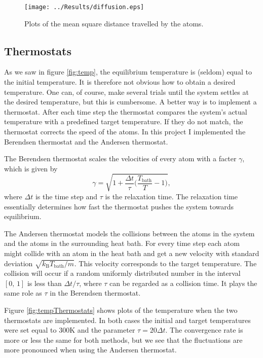 \documentclass[12pt]{article}
\newcommand{\bdi}{\begin{displaymath}}
\newcommand{\edi}{\end{displaymath}}
\begin{document}
\begin{figure}[!ht]
 \begin{center}
 \label{fig:diffusion}
  \texttt{[image: ../Results/diffusion.eps]}
  \caption{Plots of the mean square distance travelled by the atoms.}
 \end{center}
\end{figure}


\subsection{Thermostats}
\label{sec:thermostats}
As we saw in figure \ref{fig:temp}, the equilibrium temperature is (seldom) equal to the initial temperature. It is therefore not obvious how to obtain a desired temperature.
One can, of course, make several trials until the system settles at the desired temperature, but this is cumbersome. A better way is to implement a thermostat. After each time step the thermostat
compares the system's actual temperature with a predefined target temperature. If they do not match, the thermostat corrects the speed of the atoms. In this project I implemented the Berendsen thermostat and the Andersen thermostat.

The Berendsen thermostat scales the velocities of every atom with a facter $\gamma$, which is given by
\bdi
\gamma = \sqrt{1 + \frac{\Delta t}{\tau}\Big(\frac{T_{\mathrm{bath}}}{T} - 1\Big)},
\edi
where $\Delta t$ is the time step and $\tau$ is the relaxation time. The relaxation time essentially determines how fast the thermostat pushes the system towards equilibrium.

The Andersen thermostat models the collisions between the atoms in the system and the atoms in the surrounding heat bath. For every time step each atom might collide with
an atom in the heat bath and get a new velocity with standard deviation $\sqrt{k_\mathrm{B}T_\mathrm{bath}/m}$. This velocity corresponds to the target temperature.
The collision will occur if a random uniformly distributed number in the interval $[0,\,1]$ is less than $\Delta t/\tau$, where $\tau$ can be regarded as a collision time.
It plays the same role as $\tau$ in the Berendsen thermostat.

Figure \ref{fig:tempThermostats} shows plots of the temperature when the two thermostats are implemented. In both cases the initial and target temperatures were set equal to 300K and
the parameter $\tau = 20 \Delta t$. The convergence rate is more or less the same for both methods, but we see that the fluctuations are more pronounced when using
the Andersen thermostat.
\end{document}
